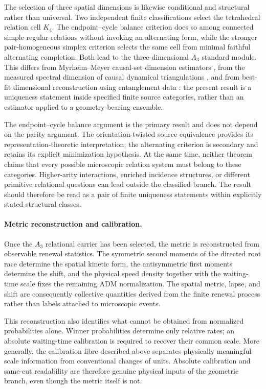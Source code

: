\documentclass[11pt]{article}
\numberwithin{equation}{section}
\theoremstyle{definition}
\theoremstyle{remark}
\begin{document}
The selection of three spatial dimensions is likewise conditional and
structural rather than universal.  Two independent finite classifications
select the tetrahedral relation cell $K_4$.  The endpoint--cycle balance
criterion does so among connected simple regular relations without invoking
an alternating form, while the stronger pair-homogeneous simplex criterion
selects the same cell from minimal faithful alternating completion.  Both
lead to the three-dimensional $A_3$ standard module.  This differs from
Myrheim--Meyer causal-set dimension estimators
\cite{Myrheim1978,Meyer1989,surya}, from the measured spectral dimension of
causal dynamical triangulations \cite{AmbjornJurkiewiczLoll2005}, and from
best-fit dimensional reconstruction using entanglement data
\cite{CaoCarrollMichalakis2017}: the present result is a uniqueness statement
inside specified finite source categories, rather than an estimator applied
to a geometry-bearing ensemble.

The endpoint--cycle balance argument is the primary result and does not
depend on the parity argument. The orientation-twisted source equivalence
provides its representation-theoretic interpretation; the alternating
criterion is secondary and retains its explicit minimization hypothesis.  At the same time,
neither theorem claims that every possible microscopic relation system must
belong to these categories.  Higher-arity interactions, enriched incidence
structures, or different primitive relational questions can lead outside the
classified branch.  The result should therefore be read as a pair of finite
uniqueness statements within explicitly stated structural classes.

\paragraph{Metric reconstruction and calibration.}

Once the $A_3$ relational carrier has been selected, the metric is
reconstructed from observable renewal statistics.  The symmetric second
moments of the directed root race determine the spatial kinetic form, the
antisymmetric first moments determine the shift, and the physical speed
density together with the waiting-time scale fixes the remaining ADM
normalization.  The spatial metric, lapse, and shift are consequently
collective quantities derived from the finite renewal process rather than
labels attached to microscopic events.

This reconstruction also identifies what cannot be obtained from normalized
probabilities alone.  Winner probabilities determine only relative rates;
an absolute waiting-time calibration is required to recover their common
scale.  More generally, the calibration fibre described above separates
physically meaningful scale information from conventional changes of units.
Absolute calibration and same-cut readability are therefore genuine physical
inputs of the geometric branch, even though the metric itself is not.
\end{document}
